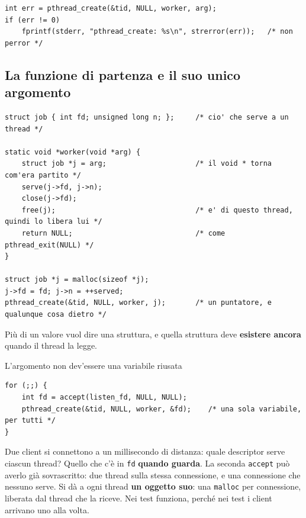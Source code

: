 
\begin{lstlisting}[language={[POSIX]C}, style=wnumbers]
int err = pthread_create(&tid, NULL, worker, arg);
if (err != 0)
    fprintf(stderr, "pthread_create: %s\n", strerror(err));   /* non perror */
\end{lstlisting}

\subsection{La funzione di partenza e il suo unico argomento}

\begin{lstlisting}[language={[POSIX]C}, style=wnumbers, title={Un argomento solo: una struct per passarne di piu'}]
struct job { int fd; unsigned long n; };     /* cio' che serve a un thread */

static void *worker(void *arg) {
    struct job *j = arg;                     /* il void * torna com'era partito */
    serve(j->fd, j->n);
    close(j->fd);
    free(j);                                 /* e' di questo thread, quindi lo libera lui */
    return NULL;                             /* come pthread_exit(NULL) */
}

struct job *j = malloc(sizeof *j);
j->fd = fd; j->n = ++served;
pthread_create(&tid, NULL, worker, j);       /* un puntatore, e qualunque cosa dietro */
\end{lstlisting}

Più di un valore vuol dire una struttura, e quella struttura deve \textbf{esistere ancora} quando il thread la legge.

\begin{warningbox}{{L'argomento non dev'essere una variabile riusata}}
\begin{lstlisting}[language={[POSIX]C}]
for (;;) {
    int fd = accept(listen_fd, NULL, NULL);
    pthread_create(&tid, NULL, worker, &fd);    /* una sola variabile, per tutti */
}
\end{lstlisting}
Due client si connettono a un millisecondo di distanza: quale descriptor serve ciascun thread? Quello che c'è in
\texttt{fd} \textbf{quando guarda}. La seconda \texttt{accept} può averlo già sovrascritto: due thread sulla stessa
connessione, e una connessione che nessuno serve. Si dà a ogni thread \textbf{un oggetto suo}: una \texttt{malloc} per
connessione, liberata dal thread che la riceve. Nei test funziona, perché nei test i client arrivano uno alla volta.
\end{warningbox}

